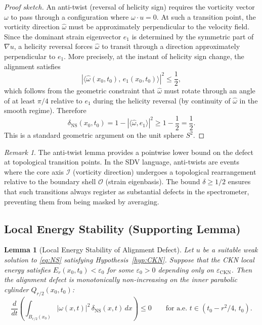 \documentclass[11pt]{article}
\newtheorem{lemma}[theorem]{Lemma}
\theoremstyle{definition}
\theoremstyle{remark}
\newtheorem{remark}[theorem]{Remark}
\newcommand{\eps}{\varepsilon}
\begin{document}
\begin{proof}[Proof sketch]
An anti-twist (reversal of helicity sign) requires the vorticity vector
$\omega$ to pass through a configuration where $\omega \cdot u = 0$.
At such a transition point, the vorticity direction $\hat\omega$ must be
approximately perpendicular to the velocity field.  Since the dominant
strain eigenvector $e_1$ is determined by the symmetric part of $\nabla u$,
a helicity reversal forces $\hat\omega$ to transit through a direction
approximately perpendicular to $e_1$.  More precisely, at the instant of
helicity sign change, the alignment satisfies
\[
  |\langle \hat\omega(x_0, t_0),\, e_1(x_0, t_0)\rangle|^2 \leq \frac{1}{2},
\]
which follows from the geometric constraint that $\hat\omega$ must rotate
through an angle of at least $\pi/4$ relative to $e_1$ during the helicity
reversal (by continuity of $\hat\omega$ in the smooth regime).  Therefore
\[
  \delta_{\mathrm{NS}}(x_0, t_0) = 1 - |\langle\hat\omega, e_1\rangle|^2
  \geq 1 - \frac{1}{2} = \frac{1}{2}.
\]
This is a standard geometric argument on the unit sphere $S^2$.
\end{proof}

\begin{remark}
The anti-twist lemma provides a pointwise lower bound on the defect at
topological transition points.  In the SDV language, anti-twists are events
where the core axis $\mathcal{I}$ (vorticity direction) undergoes a topological
rearrangement relative to the boundary shell $\mathcal{O}$ (strain eigenbasis).
The bound $\delta \geq 1/2$ ensures that such transitions always register as
substantial defects in the spectrometer, preventing them from being masked by
averaging.
\end{remark}

\subsection{Local Energy Stability (Supporting Lemma)}

\begin{lemma}[Local Energy Stability of Alignment Defect]
\label{lem:local-energy-stability}
Let $u$ be a suitable weak solution to \eqref{eq:NS} satisfying
Hypothesis~\ref{hyp:CKN}.  Suppose that the CKN local energy satisfies
$E_r(x_0, t_0) < \eps_0$ for some $\eps_0 > 0$ depending only on
$\eps_{\mathrm{CKN}}$.  Then the alignment defect is monotonically
non-increasing on the inner parabolic cylinder $Q_{r/2}(x_0, t_0)$:
\begin{equation}\label{eq:local-energy-stability}
  \frac{d}{dt}\!\left(\int_{B_{r/2}(x_0)} |\omega(x,t)|^2\,
  \delta_{\mathrm{NS}}(x,t)\, dx\right) \leq 0
  \qquad \text{for a.e.\ } t \in (t_0 - r^2/4,\, t_0).
\end{equation}
\end{lemma}
\end{document}
